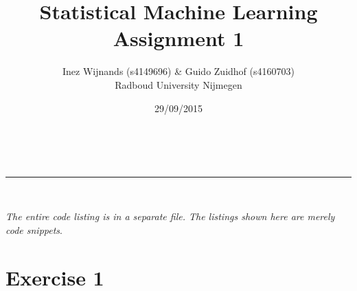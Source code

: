 \documentclass[a4paper,11pt]{article}
\makeatletter
\newcommand{\linia}{\rule{\linewidth}{0.5pt}}
\theoremstyle{mytheor}
\renewcommand{\maketitle}{
\begin{center}
\vspace{2ex}
{\huge \textsc{\@title}}
\vspace{1ex}
\\
\linia\\
\@author  \@date
\vspace{4ex}
\end{center}
}
\makeatother
\begin{document}
\title{Statistical Machine Learning \\ Assignment 1}

\author{Inez Wijnands (s4149696) \& Guido Zuidhof (s4160703)\\ Radboud University Nijmegen\\}

\date{29/09/2015}

\maketitle

\noindent \textit{The entire code listing is in a separate file. The listings shown here are merely code snippets}.\vspace{-0.5cm}
\section*{Exercise 1}
\end{document}
